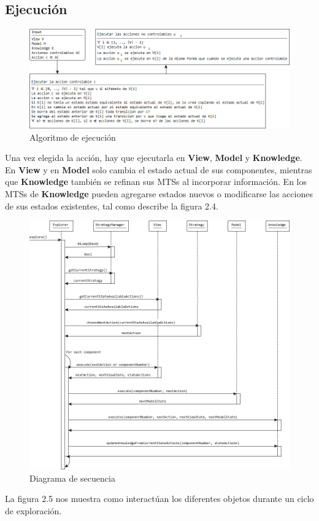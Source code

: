 \subsection{Ejecución}

\begin{figure}[H]
  \centering
    \includegraphics[width=1.0\textwidth]{Imagenes/Algoritmo/Algoritmo_ejecutar.png}
  \caption{Algoritmo de ejecución}
  \label{fig:Algoritmo_ejecutar}
\end{figure}

Una vez elegida la acción, hay que ejecutarla en \textbf{View}, \textbf{Model} y \textbf{Knowledge}. En \textbf{View} y en \textbf{Model} solo cambia el estado
actual de sus componentes, mientras que \textbf{Knowledge} también se refinan sus MTSs al incorporar información. En los MTSs de \textbf{Knowledge} pueden 
agregarse estados nuevos o modificarse las acciones de sus estados existentes, tal como describe la figura 2.4.

\begin{figure}[H]
  \centering
    \includegraphics[width=1.0\textwidth]{Imagenes/Algoritmo/Secuencia_explorar.png}
  \caption{Diagrama de secuencia}
  \label{fig:Secuencia_explorar}
\end{figure}

La figura 2.5 nos muestra como interactúan los diferentes objetos durante un ciclo de exploración.